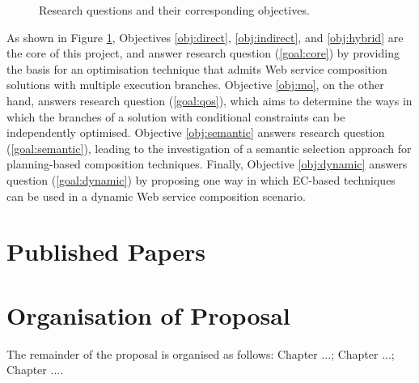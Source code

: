  \begin{figure}
\centerline{
}
\caption{Research questions and their corresponding objectives.}
\label{fig:objectives}
\end{figure}

As shown in Figure \ref{fig:objectives}, Objectives \ref{obj:direct}, \ref{obj:indirect}, and \ref{obj:hybrid} are the core of this project, and answer research question (\ref{goal:core}) by providing the basis for an optimisation technique that admits Web service composition solutions with multiple execution branches. Objective \ref{obj:mo}, on the other hand, answers research question (\ref{goal:qos}), which aims to determine the ways in which the branches of a solution with conditional constraints can be independently optimised. Objective \ref{obj:semantic} answers research question (\ref{goal:semantic}), leading to the investigation of a semantic selection approach for planning-based composition techniques. Finally, Objective \ref{obj:dynamic} answers question (\ref{goal:dynamic}) by proposing one way in which EC-based techniques can be used in a dynamic Web service composition scenario.

\section{Published Papers}

\section{Organisation of Proposal}
The remainder of the proposal is organised as follows: Chapter ...; Chapter ...; Chapter ....

